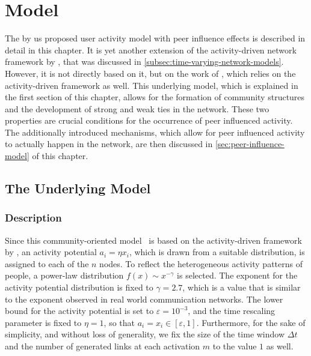 \chapter{Model}
\label{cha:model}


The by us proposed user activity model with peer influence effects is described in detail in this chapter.
It is yet another extension of the activity-driven network framework by \citet{Perra2012a}, that was discussed in \cref{subsec:time-varying-network-models}.
However, it is not directly based on it, but on the work of \citet{Laurent2015}, which relies on the activity-driven framework as well.
This underlying model, which is explained in the first section of this chapter, allows for the formation of community structures and the development of strong and weak ties in the network.
These two properties are crucial conditions for the occurrence of peer influenced activity.
The additionally introduced mechanisms, which allow for peer influenced activity to actually happen in the network, are then discussed in \cref{sec:peer-influence-model} of this chapter.




\section{The Underlying Model}
\label{sec:underlying-model}


\subsection{Description}

Since this community-oriented model~\cite{Laurent2015} is based on the activity-driven framework by \citet{Perra2012a}, an activity potential \( a_{i} = \eta x_{i} \),  which is drawn from a suitable distribution, is assigned to each of the \( n \) nodes.
To reflect the heterogeneous activity patterns of people, a power-law distribution \( f(x) \sim x^{-\gamma} \) is selected.
The exponent for the activity potential distribution is fixed to \( \gamma = 2.7 \), which is a value that is similar to the exponent observed in real world communication networks.
The lower bound for the activity potential is set to \( \varepsilon = 10^{-3} \), and the time rescaling parameter is fixed to \( \eta = 1 \), so that \( a_{i} = x_{i} \in [\varepsilon, 1] \).
Furthermore, for the sake of simplicity, and without loss of generality, we fix the size of the time window \( \Delta t \) and the number of generated links at each activation \( m \) to the value \( 1 \) as well.

